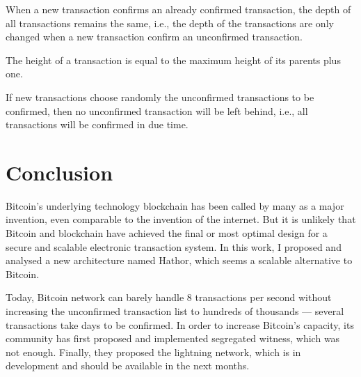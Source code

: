 
\begin{theorem}
\label{theorem-new-tx-not-tip}
When a new transaction confirms an already confirmed transaction, the depth of all transactions remains the same, i.e., the depth of the transactions are only changed when a new transaction confirm an unconfirmed transaction.
\end{theorem}

\begin{theorem}
The height of a transaction is equal to the maximum height of its parents plus one.
\end{theorem}

\begin{theorem}
If new transactions choose randomly the unconfirmed transactions to be confirmed, then no unconfirmed transaction will be left behind, i.e., all transactions will be confirmed in due time.
\end{theorem}

\chapter{Conclusion}

Bitcoin's underlying technology blockchain has been called by many as a major invention, even comparable to the invention of the internet. But it is unlikely that Bitcoin and blockchain have achieved the final or most optimal design for a secure and scalable electronic transaction system. In this work, I proposed and analysed a new architecture named Hathor, which seems a scalable alternative to Bitcoin.

Today, Bitcoin network can barely handle 8 transactions per second without increasing the unconfirmed transaction list to hundreds of thousands --- several transactions take days to be confirmed. In order to increase Bitcoin's capacity, its community has first proposed and implemented segregated witness, which was not enough. Finally, they proposed the lightning network, which is in development and should be available in the next months.

